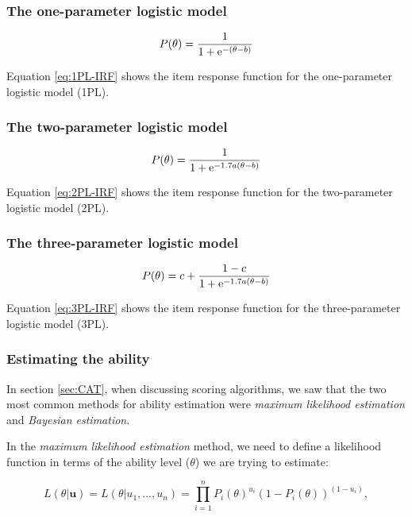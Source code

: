 \subsubsection{The one-parameter logistic model}
\begin{equation} \label{eq:1PL-IRF}
P(\theta) = \frac{1}{1 + \mathrm{e}^{-(\theta - b)}}
\end{equation}

Equation \eqref{eq:1PL-IRF} shows the item response function for the one-parameter logistic model (1PL). 

\subsubsection{The two-parameter logistic model}
\begin{equation} \label{eq:2PL-IRF}
P(\theta) = \frac{1}{1 + \mathrm{e}^{-1.7a(\theta - b)}}
\end{equation}

Equation \eqref{eq:2PL-IRF} shows the item response function for the two-parameter logistic model (2PL). 

\subsubsection{The three-parameter logistic model}
\begin{equation} \label{eq:3PL-IRF}
P(\theta) = c + \frac{1 - c}{1 + \mathrm{e}^{-1.7a(\theta - b)}}
\end{equation}

Equation \eqref{eq:3PL-IRF} shows the item response function for the three-parameter logistic model (3PL). 

\subsubsection{Estimating the ability}
In section \ref{sec:CAT}, when discussing scoring algorithms, we saw that the two most common methods for ability estimation were \textit{maximum likelihood estimation} and \textit{Bayesian estimation}.\newline

In the \textit{maximum likelihood estimation} method, we need to define a likelihood function in terms of the ability level ($\theta$) we are trying to estimate:

\begin{equation*}
L(\theta | \textbf{u}) = L(\theta | u_1, ..., u_n) = \prod_{i=1}^n P_i(\theta)^{u_i}(1 - P_i(\theta))^{(1 - u_i)} ,
\end{equation*}

